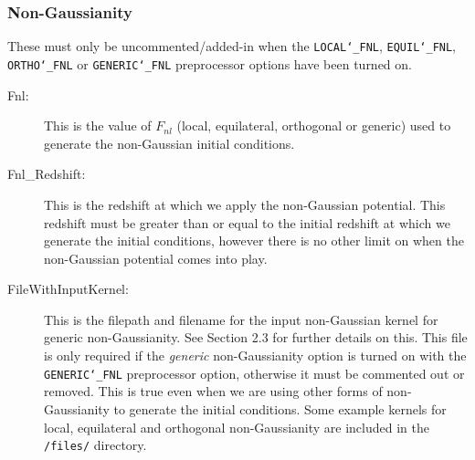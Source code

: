 \documentclass[12pt,twoside,a4paper]{article}
\begin{document}
\subsubsection{Non-Gaussianity}
These must only be uncommented/added-in when the \texttt{LOCAL\char`_FNL}, \texttt{EQUIL\char`_FNL}, \texttt{ORTHO\char`_FNL} or \texttt{GENERIC\char`_FNL} preprocessor options have been turned on.
\begin{description}
\item[Fnl:]{This is the value of $F_{nl}$ (local, equilateral, orthogonal or generic) used to generate the non-Gaussian initial conditions.}
\item[Fnl\_Redshift:]{This is the redshift at which we apply the non-Gaussian potential. This redshift must be greater than or equal to the initial redshift at which we generate the initial conditions, however there is no other limit on when the non-Gaussian potential comes into play.}
\item[FileWithInputKernel:]{This is the filepath and filename for the input non-Gaussian kernel for generic non-Gaussianity. See Section 2.3 for further details on this. This file is only required if the \emph{generic} non-Gaussianity option is turned on with the \texttt{GENERIC\char`_FNL} preprocessor option, otherwise it must be commented out or removed. This is true even when we are using other forms of non-Gaussianity to generate the initial conditions. Some example kernels for local, equilateral and orthogonal non-Gaussianity are included in the \texttt{/files/} directory.}
\end{description}
\end{document}
